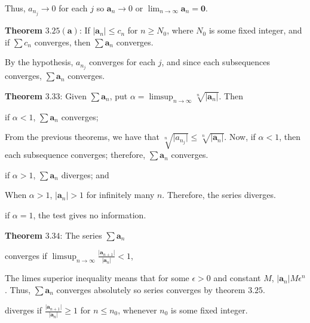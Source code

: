 \begin{exercise}
  Thus, \(a_{n_j}\to 0\) for each \(j\) so \(\mathbold{a}_n\to 0\) or
  \(\lim_{n\to\infty}\mathbold{a}_n = \mathbold{0}\).
  \par\smallskip
  \textbf{Theorem} \(\mathbold{3.25(a)}\): If
  \(\lvert\mathbold{a}_n\rvert\leq c_n\) for \(n\geq N_0\), where \(N_0\) is
  some fixed integer, and if \(\sum c_n\) converges, then
  \(\sum\mathbold{a}_n\) converges.
  \par\smallskip
  By the hypothesis, \(a_{n_j}\) converges for each \(j\), and since each
  subsequences converges, \(\sum\mathbold{a}_n\) converges.
  \par\smallskip
  \textbf{Theorem} \(\mathbold{3.33}\): Given \(\sum\mathbold{a}_n\), put
  \(\alpha = \limsup_{n\to\infty}\sqrt[n]{\lvert\mathbold{a}_n\vert}\).
  Then
  \begin{exercise}[label = (\alph*)]
  \item
    if \(\alpha < 1\), \(\sum\mathbold{a}_n\) converges;
    \par\smallskip
    From the previous theorems, we have that
    \(\sqrt[n]{\lvert a_{n_j}\rvert}\leq\sqrt[n]{\lvert\mathbold{a}_n\rvert}\).
    Now, if \(\alpha < 1\), then each subsequence converges; therefore,
    \(\sum\mathbold{a}_n\) converges.
  \item
    if \(\alpha > 1\), \(\sum\mathbold{a}_n\) diverges; and
    \par\smallskip
    When \(\alpha > 1\), \(\lvert\mathbold{a}_n\rvert > 1\) for infinitely
    many \(n\).
    Therefore, the series diverges.
  \item
    if \(\alpha = 1\), the test gives no information.
  \end{exercise}
  \textbf{Theorem} \(\mathbold{3.34}\): The series \(\sum\mathbold{a}_n\)
  \begin{exercise}[label = (\alph*)]
  \item
    converges if \(\limsup_{n\to\infty}\frac{\lvert\mathbold{a}_{n + 1}\rvert}
    {\lvert\mathbold{a}_n\rvert} < 1\),
    \par\smallskip
    The limes superior inequality means that for some \(\epsilon > 0\) and
    constant \(M\), \(\lvert\mathbold{a}_n\rvert M\epsilon ^n\).
    Thus, \(\sum\mathbold{a}_n\) converges absolutely so series converges by
    theorem \(3.25\).
  \item
    diverges if \(\frac{\lvert\mathbold{a}_{n + 1}\rvert}
    {\lvert\mathbold{a}_n\rvert}\geq 1\) for \(n\leq n_0\), whenever \(n_0\) is
    some fixed integer.
    \par\smallskip

\end{exercise}
\end{exercise}
